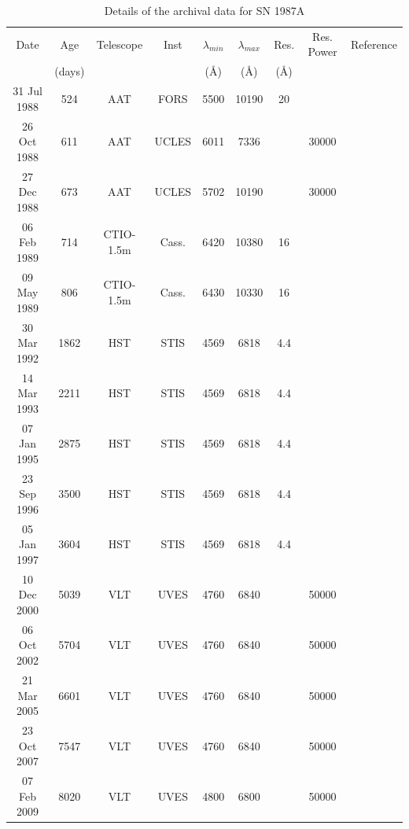 \documentclass[useAMS,usenatbib,usegraphicx]{mnras}
\begin{document}
\begin{table}
	\begin{minipage}{180mm}
	\caption{Details of the archival data for SN 1987A}
	\label{tb:data}
  	\begin{tabular}{@{} ccccccccl @{}}
    	\hline
	Date & Age & Telescope  & Inst & $\lambda_{min}$ & $\lambda_{max}$ & Res. & Res. Power & Reference \\
	& (days) & & &(\AA) & (\AA)& (\AA)\\
	\hline
31 Jul 1988 & 524 & AAT & FORS & 5500 & 10190 & 20 & & \citet{Spyromilio1991} \\
26 Oct 1988 & 611 & AAT & UCLES & 6011 & 7336 &  & 30000 & \citet{Hanuschik1993, Spyromilio1993a}\\
27 Dec 1988 & 673 & AAT & UCLES & 5702 & 10190 &  & 30000 & \citet{Hanuschik1993, Spyromilio1993a}\\
06 Feb 1989 & 714 & CTIO-1.5m & Cass. & 6420 & 10380 & 16 & & \citet{Phillips1990}\\
09 May 1989 & 806 & CTIO-1.5m & Cass. & 6430 & 10330 & 16 & & \citet{Phillips1990}\\
30 Mar 1992 & 1862 & HST & STIS & 4569 & 6818 & 4.4 &  & \citet{Wang1996}\\
14 Mar 1993 & 2211 & HST & STIS & 4569 & 6818 & 4.4 &  & \citet{Wang1996}\\
07 Jan 1995 & 2875 & HST & STIS & 4569 & 6818 & 4.4 &  & \citet{Chugai1997}\\
23 Sep 1996 & 3500 & HST & STIS & 4569 & 6818 & 4.4 &  \\
05 Jan 1997 & 3604 & HST & STIS & 4569 & 6818 & 4.4 &  \\
10 Dec 2000 & 5039 & VLT & UVES & 4760 & 6840 &  & 50000 & \citet{Groeningsson2006, Groeningsson2007}\\
06 Oct 2002 & 5704 & VLT & UVES & 4760 & 6840 &  & 50000 & \citet{Groeningsson2006, Groeningsson2007, Groningsson2008}\\
21 Mar 2005 & 6601 & VLT & UVES & 4760 & 6840 &  & 50000 &\citet{Groeningsson2006, Groeningsson2007}\\
23 Oct 2007 & 7547 & VLT & UVES & 4760 & 6840 &  & 50000 & \citet{Groeningsson2007}\\
07 Feb 2009 & 8020 & VLT & UVES & 4800 & 6800 &  & 50000 & \citet{Tziamtzis2010}\\
    \hline
  \end{tabular}
\end{minipage}
\end{table}
\end{document}
